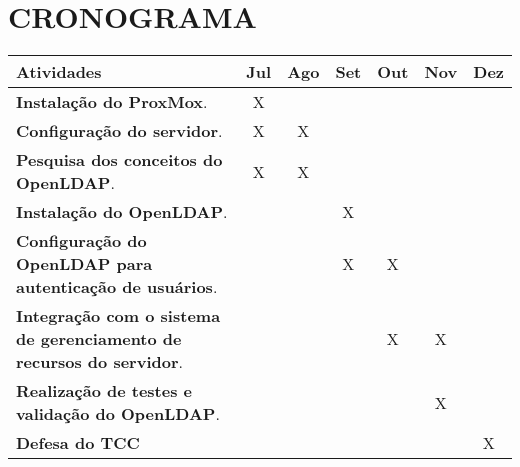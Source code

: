 \newpage

\section{CRONOGRAMA}
\label{sec:cronograma}


\begin{center}
	\begin{tabular}{ |p{8cm}|c|c|c|c|c|c| }
		\hline
		\textbf{Atividades} & \textbf{Jul} & \textbf{Ago} & \textbf{Set} & \textbf{Out} & \textbf{Nov} & \textbf{Dez} \\
		\hline
		\textbf{Instalação do ProxMox}. & X  &  &  &  &  &   \\
		\hline
		\textbf{Configuração do servidor}. & X & X  &  &  &  &   \\
		\hline
		\textbf{Pesquisa dos conceitos do OpenLDAP}. & X & X  &  &  &  &  \\
		\hline
		\textbf{Instalação do OpenLDAP}. &  & & X  &  &  & \\
		\hline
		\textbf{Configuração do OpenLDAP para autenticação de usuários}. &  &  & X & X  &  &\\
		\hline
        \textbf{Integração com o sistema de gerenciamento de recursos do servidor}. &  &  & & X & X  &\\
		\hline
        \textbf{Realização de testes e validação do OpenLDAP}. &  &  &  &  & X  &\\
		\hline
		\textbf{Defesa do TCC} &  &  &  &  &  & X \\
		\hline
	\end{tabular}
\end{center}
